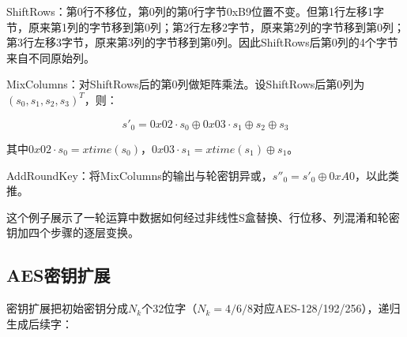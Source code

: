 ShiftRows：第0行不移位，第0列的第0行字节0xB9位置不变。但第1行左移1字节，原来第1列的字节移到第0列；第2行左移2字节，原来第2列的字节移到第0列；第3行左移3字节，原来第3列的字节移到第0列。因此ShiftRows后第0列的4个字节来自不同原始列。

MixColumns：对ShiftRows后的第0列做矩阵乘法。设ShiftRows后第0列为$(s_0, s_1, s_2, s_3)^T$，则：

\begin{equation}
s'_0 = 0x02 \cdot s_0 \oplus 0x03 \cdot s_1 \oplus s_2 \oplus s_3
\end{equation}

其中$0x02 \cdot s_0 = xtime(s_0)$，$0x03 \cdot s_1 = xtime(s_1) \oplus s_1$。

AddRoundKey：将MixColumns的输出与轮密钥异或，$s''_0 = s'_0 \oplus 0xA0$，以此类推。

这个例子展示了一轮运算中数据如何经过非线性S盒替换、行位移、列混淆和轮密钥加四个步骤的逐层变换。

\subsection{AES密钥扩展}

密钥扩展把初始密钥分成$N_k$个32位字（$N_k = 4/6/8$对应AES-128/192/256），递归生成后续字：

